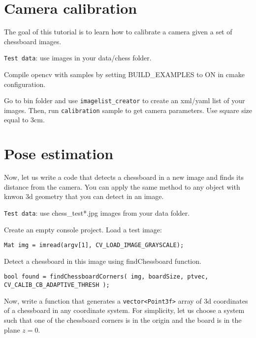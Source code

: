 

\ifCpp
\section{Camera calibration}
The goal of this tutorial is to learn how to calibrate a camera given a set of chessboard images. 

\texttt{Test data}: use images in your data/chess folder. 

Compile opencv with samples by setting BUILD\_EXAMPLES to ON in cmake configuration. 

Go to bin folder and use \texttt{imagelist\_creator} to create an xml/yaml list of your images. Then, run \texttt{calibration} sample to get camera parameters. Use square size equal to 3cm. 

\section{Pose estimation}
Now, let us write a code that detects a chessboard in a new image and finds its distance from the camera. You can apply the same method to any object with knwon 3d geometry that you can detect in an image.

\texttt{Test data}: use chess\_test*.jpg images from your data folder.

Create an empty console project. Load a test image:
\begin{lstlisting}
Mat img = imread(argv[1], CV_LOAD_IMAGE_GRAYSCALE);
\end{lstlisting}

Detect a chessboard in this image using findChessboard function. 
\begin{lstlisting}
bool found = findChessboardCorners( img, boardSize, ptvec, CV_CALIB_CB_ADAPTIVE_THRESH );
\end{lstlisting}

Now, write a function that generates a \texttt{vector<Point3f>} array of 3d coordinates of a chessboard in any coordinate system. For simplicity, let us choose a system such that one of the chessboard corners is in the origin and the board is in the plane \(z = 0\).

